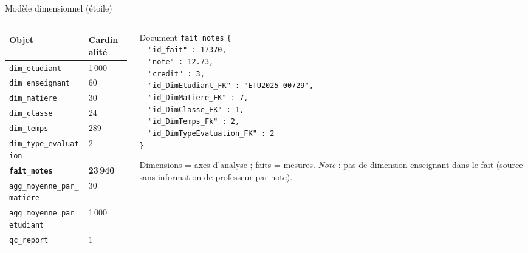 \documentclass[10pt]{beamer}
\begin{document}
\begin{frame}{Modèle dimensionnel (étoile)}
  \begin{columns}
    \begin{column}{0.52\textwidth}
      \scriptsize
      \begin{tabular}{@{}ll@{}}
        \toprule
        \textbf{Objet} & \textbf{Cardinalité} \\
        \midrule
        \texttt{dim\_etudiant} & 1\,000 \\
        \texttt{dim\_enseignant} & 60 \\
        \texttt{dim\_matiere} & 30 \\
        \texttt{dim\_classe} & 24 \\
        \texttt{dim\_temps} & 289 \\
        \texttt{dim\_type\_evaluation} & 2 \\
        \midrule
        \textbf{\texttt{fait\_notes}} & \textbf{23\,940} \\
        \midrule
        \texttt{agg\_moyenne\_par\_matiere} & 30 \\
        \texttt{agg\_moyenne\_par\_etudiant} & 1\,000 \\
        \texttt{qc\_report} & 1 \\
        \bottomrule
      \end{tabular}
    \end{column}
    \begin{column}{0.48\textwidth}
      \begin{block}{Document \texttt{fait\_notes}}
        \scriptsize
        \texttt{\{ \\
          ~~"id\_fait" : 17370,\\
          ~~"note" : 12.73,\\
          ~~"credit" : 3,\\
          ~~"id\_DimEtudiant\_FK" : "ETU2025-00729",\\
          ~~"id\_DimMatiere\_FK" : 7,\\
          ~~"id\_DimClasse\_FK" : 1,\\
          ~~"id\_DimTemps\_Fk" : 2,\\
          ~~"id\_DimTypeEvaluation\_FK" : 2\\
          \}}
      \end{block}
      Dimensions = axes d'analyse ; faits = mesures.
      \emph{Note} : pas de dimension enseignant dans le fait
      (source sans information de professeur par note).
    \end{column}
  \end{columns}
\end{frame}
\end{document}
